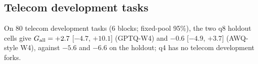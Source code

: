 \subsection{Telecom development tasks}
\label{app:holdoutdev}

On 80 telecom development tasks (6 blocks; fixed-pool 95\%), the two q8 holdout cells give $G_{\mathrm{all}}=+2.7$ [$-4.7$, $+10.1$] (GPTQ-W4) and $-0.6$ [$-4.9$, $+3.7$]\pp{} (AWQ-style W4), against $-5.6$ and $-6.6$ on the holdout; q4 has no telecom development forks. %


